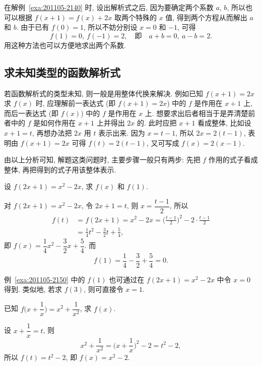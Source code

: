 在解例~\ref{exa:201105-2140} 时, 设出解析式之后, 因为要确定两个系数 $a$, $b$, 所以也可以根据 $f(x+1)=f(x)+2x$ 取两个特殊的 $x$ 值, 得到两个方程从而解出 $a$ 和 $b$. 由于已有 $f(0)=1$, 所以不妨分别设 $x=0$ 和 $-1$, 可得 \[f(1)=0,\ f(-1)=2,\quad \text{即}\quad a+b=0,\ a-b=2.\]
用这种方法也可以方便地求出两个系数.

\subsection{求未知类型的函数解析式}

若函数解析式的类型未知, 则一般是用整体代换来解决. 例如已知 $f(x+1)=2x$ 求 $f(x)$ 时, 应理解前一表达式 (即 $f(x+1)=2x$) 中的 $f$ 是作用在 $x+1$ 上, 而后一表达式 (即 $f(x)$) 中的 $f$ 是作用在 $x$ 上. 想要求出后者相当于是弄清楚前者中的 $f$ 是如何作用在 $x+1$ 上并得出 $2x$ 的. 此时应把 $x+1$ 看成整体, 比如设 $x+1=t$, 再想办法把 $2x$ 用 $t$ 表示出来. 因为 $x=t-1$, 所以 $2x=2(t-1)$, 表明由 $f(x+1)=2x$ 可得 $f(t)=2(t-1)$, 又可写成 $f(x)=2(x-1)$. 

由以上分析可知, 解题这类问题时, 主要步骤一般只有两步: 先把 $f$ 作用的式子看成整体, 再把得到的式子用该整体表示.

\begin{example}\label{exa:201105-2150}
    设 $f(2x+1)=x^2-2x$, 求 $f(x)$ 和 $f(1)$.
\end{example}
\begin{solution}
    对 $f(2x+1)=x^2-2x$, 令 $2x+1=t$, 则 $x=\dfrac{t-1}2$, 所以
    \begin{align*}
        f(t)&=f(2x+1)=x^2-2x= \biggl(\frac{t-1}2\biggr)^2- 2\cdot\frac{t-1}2\\
        &= \frac14 t^2- \frac32 t+ \frac54,
    \end{align*}
    即 $f(x)= \dfrac14 x^2- \dfrac32 x+ \dfrac54$. 而
    \[f(1)= \frac14- \frac32+ \frac54=0.\]
\end{solution}

例~\ref{exa:201105-2150} 中的 $f(1)$ 也可通过在 $f(2x+1)=x^2-2x$ 中令 $x=0$ 得到. 类似地, 若求 $f(3)$, 则可直接令 $x=1$.

\begin{example}\label{exa:201105-2200}
    已知 $f\biggl(x+\dfrac1x\biggr)= x^2+\dfrac1{x^2}$, 求 $f(x)$.
\end{example}
\begin{solution}
    设 $x+\dfrac1x=t$, 则 
    \[x^2+\frac1{x^2}= \biggl(x+\dfrac1x\biggr)^2-2= t^2-2,\]
    所以 $f(t)= t^2-2$, 即 $f(x)=x^2-2$.
\end{solution}

